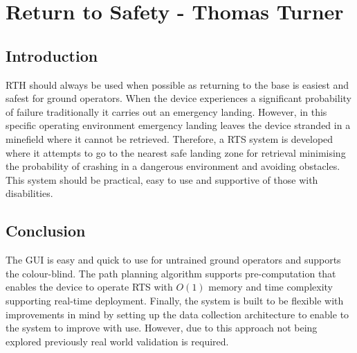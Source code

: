 \newpage
{}
\section{Return to Safety - Thomas Turner} \label{Return to Safety}

\subsection{Introduction}\label{sub_section:tgt_RTS_intro}
\gls{RTH} should always be used when possible as returning to the base is easiest and safest for ground operators. When the device experiences a significant probability of failure traditionally it carries out an emergency landing. However, in this specific operating environment emergency landing leaves the device stranded in a minefield where it cannot be retrieved. Therefore, a \gls{RTS} system is developed where it attempts to go to the nearest safe landing zone for retrieval minimising the probability of crashing in a dangerous environment and avoiding obstacles. This system should be practical, easy to use and supportive of those with disabilities.





\subsection{Conclusion}
The \gls{GUI} is easy and quick to use for untrained ground operators and supports the colour-blind. The path planning algorithm supports pre-computation that enables the device to operate \gls{RTS} with $O(1)$ memory and time complexity supporting real-time deployment. Finally, the system is built to be flexible with improvements in mind by setting up the data collection architecture to enable to the system to improve with use. However, due to this approach not being explored previously real world validation is required.